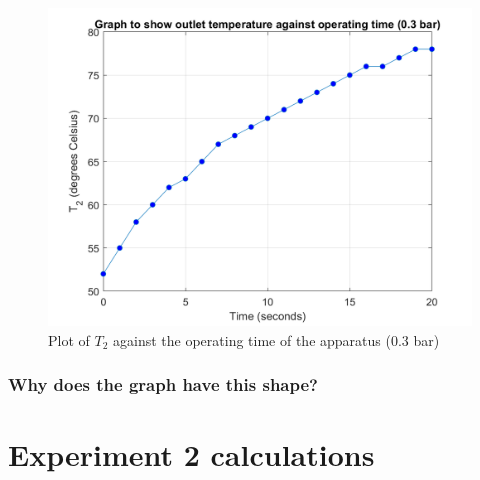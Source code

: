 \documentclass[class=article, crop=false, 12pt,a4paper]{standalone}
\begin{document}
\begin{figure}
  \includegraphics[width = 0.9 \textwidth]{./img/T203vsTimeGraph}
  \caption{Plot of \(T_2\) against the operating time of the apparatus (0.3 bar)}
  \label{ref:T203vsTime1bar}
\end{figure}
\subsubsection{Why does the graph have this shape?}

\section{Experiment 2 calculations}
\end{document}
